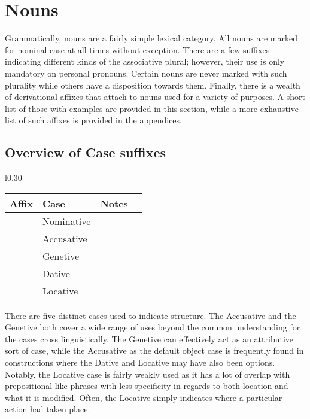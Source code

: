 \section{Nouns}
Grammatically, nouns are a fairly simple lexical category. All nouns are marked for nominal case at all times without exception. There are a few suffixes indicating different kinds of the associative plural; however, their use is only mandatory on personal pronouns. Certain nouns are never marked with such plurality while others have a disposition towards them.  Finally, there is a wealth of derivational affixes that attach to nouns used for a variety of purposes. A short list of those with examples are provided in this section, while a more exhaustive list of such affixes is provided in the appendices.

\subsection{Overview of Case suffixes}
\begin{wrapfigure}{l}{0.30\textwidth}
  \begin{tabular}{|l|l|l|l|}
    \hline
    Affix                    & Case       & Notes  \\ \hline \hline
    \suffixtext{\varnothing} & Nominative &        \\ \hline
    \suffixtext{\acc}        & Accusative &        \\ \hline
    \suffixtext{\gen}        & Genetive   &        \\ \hline
    \suffixtext{\dat}        & Dative     &        \\ \hline
    \suffixtext{\loc}        & Locative   &        \\ \hline
  \end{tabular}
\end{wrapfigure}
There are five distinct cases used to indicate structure. The Accusative and the Genetive both cover a wide range of uses beyond the common understanding for the cases cross linguistically. The Genetive can effectively act as an attributive sort of case, while the Accusative as the default object case is frequently found in constructions where the Dative and Locative may have also been options. Notably, the Locative case is fairly weakly used as it has a lot of overlap with prepositional like phrases with less specificity in regards to both location and what it is modified. Often, the Locative simply indicates where a particular action had taken place.

